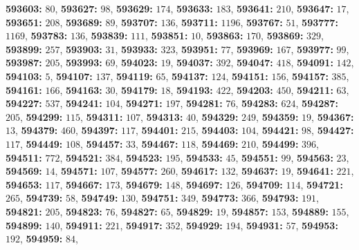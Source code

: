\textsf{\bfseries 593603:} $80$, \textsf{\bfseries 593627:} $98$, \textsf{\bfseries 593629:} $174$, \textsf{\bfseries 593633:} $183$, \textsf{\bfseries 593641:} $210$, \textsf{\bfseries 593647:} $17$, \textsf{\bfseries 593651:} $208$, \textsf{\bfseries 593689:} $89$, \textsf{\bfseries 593707:} $136$, \textsf{\bfseries 593711:} $1196$, \textsf{\bfseries 593767:} $51$, \textsf{\bfseries 593777:} $1169$, \textsf{\bfseries 593783:} $136$, \textsf{\bfseries 593839:} $111$, \textsf{\bfseries 593851:} $10$, \textsf{\bfseries 593863:} $170$, \textsf{\bfseries 593869:} $329$, \textsf{\bfseries 593899:} $257$, \textsf{\bfseries 593903:} $31$, \textsf{\bfseries 593933:} $323$, \textsf{\bfseries 593951:} $77$, \textsf{\bfseries 593969:} $167$, \textsf{\bfseries 593977:} $99$, \textsf{\bfseries 593987:} $205$, \textsf{\bfseries 593993:} $69$, \textsf{\bfseries 594023:} $19$, \textsf{\bfseries 594037:} $392$, \textsf{\bfseries 594047:} $418$, \textsf{\bfseries 594091:} $142$, \textsf{\bfseries 594103:} $5$, \textsf{\bfseries 594107:} $137$, \textsf{\bfseries 594119:} $65$, \textsf{\bfseries 594137:} $124$, \textsf{\bfseries 594151:} $156$, \textsf{\bfseries 594157:} $385$, \textsf{\bfseries 594161:} $166$, \textsf{\bfseries 594163:} $30$, \textsf{\bfseries 594179:} $18$, \textsf{\bfseries 594193:} $422$, \textsf{\bfseries 594203:} $450$, \textsf{\bfseries 594211:} $63$, \textsf{\bfseries 594227:} $537$, \textsf{\bfseries 594241:} $104$, \textsf{\bfseries 594271:} $197$, \textsf{\bfseries 594281:} $76$, \textsf{\bfseries 594283:} $624$, \textsf{\bfseries 594287:} $205$, \textsf{\bfseries 594299:} $115$, \textsf{\bfseries 594311:} $107$, \textsf{\bfseries 594313:} $40$, \textsf{\bfseries 594329:} $249$, \textsf{\bfseries 594359:} $19$, \textsf{\bfseries 594367:} $13$, \textsf{\bfseries 594379:} $460$, \textsf{\bfseries 594397:} $117$, \textsf{\bfseries 594401:} $215$, \textsf{\bfseries 594403:} $104$, \textsf{\bfseries 594421:} $98$, \textsf{\bfseries 594427:} $117$, \textsf{\bfseries 594449:} $108$, \textsf{\bfseries 594457:} $33$, \textsf{\bfseries 594467:} $118$, \textsf{\bfseries 594469:} $210$, \textsf{\bfseries 594499:} $396$, \textsf{\bfseries 594511:} $772$, \textsf{\bfseries 594521:} $384$, \textsf{\bfseries 594523:} $195$, \textsf{\bfseries 594533:} $45$, \textsf{\bfseries 594551:} $99$, \textsf{\bfseries 594563:} $23$, \textsf{\bfseries 594569:} $14$, \textsf{\bfseries 594571:} $107$, \textsf{\bfseries 594577:} $260$, \textsf{\bfseries 594617:} $132$, \textsf{\bfseries 594637:} $19$, \textsf{\bfseries 594641:} $221$, \textsf{\bfseries 594653:} $117$, \textsf{\bfseries 594667:} $173$, \textsf{\bfseries 594679:} $148$, \textsf{\bfseries 594697:} $126$, \textsf{\bfseries 594709:} $114$, \textsf{\bfseries 594721:} $265$, \textsf{\bfseries 594739:} $58$, \textsf{\bfseries 594749:} $130$, \textsf{\bfseries 594751:} $349$, \textsf{\bfseries 594773:} $366$, \textsf{\bfseries 594793:} $191$, \textsf{\bfseries 594821:} $205$, \textsf{\bfseries 594823:} $76$, \textsf{\bfseries 594827:} $65$, \textsf{\bfseries 594829:} $19$, \textsf{\bfseries 594857:} $153$, \textsf{\bfseries 594889:} $155$, \textsf{\bfseries 594899:} $140$, \textsf{\bfseries 594911:} $221$, \textsf{\bfseries 594917:} $352$, \textsf{\bfseries 594929:} $194$, \textsf{\bfseries 594931:} $57$, \textsf{\bfseries 594953:} $192$, \textsf{\bfseries 594959:} $84$, 
